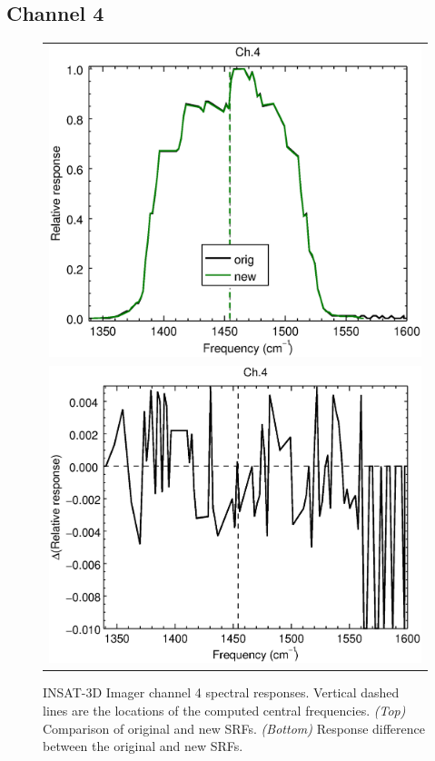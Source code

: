 \subsection{Channel 4}
\begin{figure}[H]
  \centering
  \begin{tabular}{c}
    \includegraphics[scale=0.55]{graphics/imgr/srf/imgr_insat3d-4.eps} \\
    \includegraphics[scale=0.55]{graphics/imgr/srf/imgr_insat3d-4.difference.eps}
  \end{tabular}
  \caption{INSAT-3D Imager channel 4 spectral responses. Vertical dashed lines are the locations of the computed central frequencies. \emph{(Top)} Comparison of original and new SRFs. \emph{(Bottom)} Response difference between the original and new SRFs.}
  \label{fig:imgr_ch4}
\end{figure}


